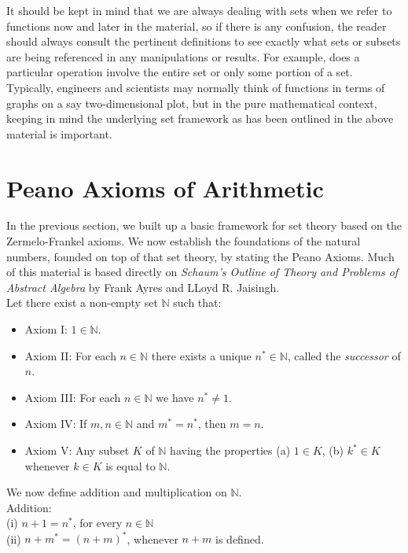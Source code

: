 It should be kept in mind that we are always dealing with sets when we refer to functions now and later in the material, so if there is any confusion, the reader should always consult the pertinent definitions to see exactly what sets or subsets are being referenced in any manipulations or results.  For example, does a particular operation involve the entire set or only some portion of a set.  Typically, engineers and scientists may normally think of functions in terms of graphs on a say two-dimensional plot, but in the pure mathematical context, keeping in mind the underlying set framework as has been outlined in the above material is important.

\section{Peano Axioms of Arithmetic}

In the previous section, we built up a basic framework for set theory based on the Zermelo-Frankel axioms.  We now establish the foundations of the natural numbers, founded on top of that set theory, by stating the Peano Axioms.  Much of this material is based directly on \textit{Schaum's Outline of Theory and Problems of Abstract Algebra} by Frank Ayres and LLoyd R. Jaisingh.\\

Let there exist a non-empty set $\mathbb{N}$ such that:

\begin{itemize}
\item Axiom I:  $1 \in \mathbb{N}$.
\item Axiom II:  For each $n \in \mathbb{N}$ there exists a unique $n^{*} \in \mathbb{N}$, called the \textit{successor} of $n$.
\item Axiom III:  For each $n \in \mathbb{N}$ we have $n^{*} \ne 1$.
\item Axiom IV:  If $m,n \in \mathbb{N}$ and $m^{*}=n^{*}$, then $m=n$.
\item Axiom V:  Any subset $K$ of $\mathbb{N}$ having the properties (a) $1 \in K$, (b) $k^{*} \in K$ whenever $k \in K$ is equal to $\mathbb{N}$. 
\end{itemize}

We now define addition and multiplication on $\mathbb{N}$.\\

Addition:\\
(i) $n+1=n^{*}$, for every $n \in \mathbb{N}$\\
(ii) $n+m^{*}=(n+m)^{*}$, whenever $n+m$ is defined.\\

